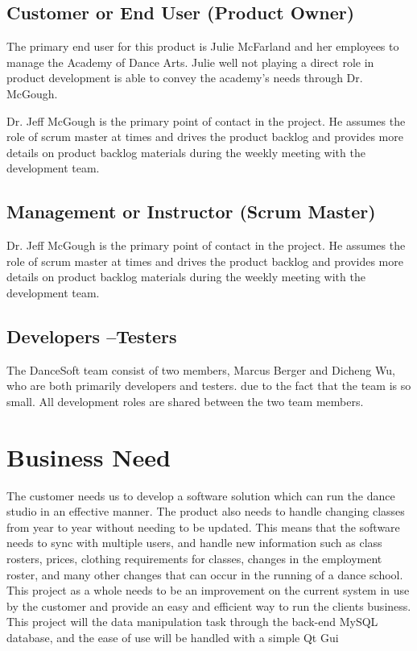 \subsection{Customer or End User (Product Owner)}
The primary end user for this product is Julie McFarland and her employees to manage the Academy of Dance Arts. Julie well not playing a direct role in product development is able to convey the academy's needs through Dr. McGough.

Dr. Jeff McGough is the primary point of contact in the project. He assumes the role of scrum master at times and drives the product backlog and provides more details on product backlog materials during the weekly meeting with the development team. 

\subsection{Management or Instructor (Scrum Master)}
Dr. Jeff McGough is the primary point of contact in the project. He assumes the role of scrum master at times and drives the product backlog and provides more details on product backlog materials during the weekly meeting with the development team.


\subsection{Developers --Testers}
The DanceSoft team consist of two members, Marcus Berger and Dicheng Wu, who are both primarily developers and testers. due to the fact that the team is so small. All development roles are shared between the two team members.


\section{Business Need}
The customer needs us to develop a software solution which can run the dance studio in an effective manner. The product also needs to handle changing classes from year to year without needing to be updated. This means that the software needs to sync with multiple users, and handle new information such as class rosters, prices, clothing requirements for classes, changes in the employment roster, and many other changes that can occur in the running of a dance school.\\
This project as a whole needs to be an improvement on the current system in use by the customer and provide an easy and efficient way to run the clients business. This project will  the data manipulation task through the back-end MySQL database, and the ease of use will be handled with a simple Qt Gui  

